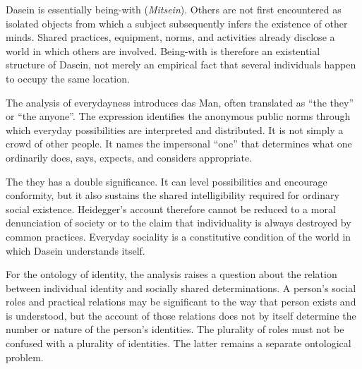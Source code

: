 Dasein is essentially being-with (\textit{Mitsein}).
Others are not first encountered as isolated objects
from which a subject subsequently infers the existence
of other minds. Shared practices, equipment, norms,
and activities already disclose a world in which
others are involved. Being-with is therefore an
existential structure of Dasein, not merely an
empirical fact that several individuals happen
to occupy the same location.
\cite[§§25--27]{HeideggerBeingTime}

\label{para:VS.B01.P01.C08.S11.SS07.P002}

The analysis of everydayness introduces das Man,
often translated as ``the they'' or ``the anyone''.
The expression identifies the anonymous public
norms through which everyday possibilities are
interpreted and distributed. It is not simply
a crowd of other people. It names the impersonal
``one'' that determines what one ordinarily does,
says, expects, and considers appropriate.
\cite[§27]{HeideggerBeingTime}

\label{para:VS.B01.P01.C08.S11.SS07.P003}

The they has a double significance. It can level
possibilities and encourage conformity, but it
also sustains the shared intelligibility required
for ordinary social existence. Heidegger's account
therefore cannot be reduced to a moral denunciation
of society or to the claim that individuality is
always destroyed by common practices. Everyday
sociality is a constitutive condition of the world
in which Dasein understands itself.
\cite[§§27, 35--38]{HeideggerBeingTime}

\label{para:VS.B01.P01.C08.S11.SS07.P004}

For the ontology of identity, the analysis raises
a question about the relation between individual
identity and socially shared determinations. A
person's social roles and practical relations may
be significant to the way that person exists and
is understood, but the account of those relations
does not by itself determine the number or nature
of the person's identities. The plurality of roles
must not be confused with a plurality of identities.
The latter remains a separate ontological problem.



